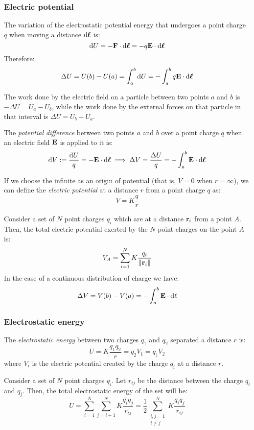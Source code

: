 \documentclass[../../../main.tex]{subfiles}
\begin{document}
\begin{multicols}{2}
    \subsubsection{Electric potential}
    \begin{prop}
        The variation of the electrostatic potential energy that undergoes a point charge $q$ when moving a distance $\dd\boldsymbol{\mathrm{\ell}}$ is:
        $$\dd U=-\boldsymbol{\mathrm{F}}\cdot \dd\boldsymbol{\mathrm{\ell}}=-q\boldsymbol{\mathrm{E}}\cdot \dd\boldsymbol{\mathrm{\ell}}$$
        Therefore:
        $$\Delta U=U(b)-U(a)=\int_a^b\dd U=-\int_a^bq\boldsymbol{\mathrm{E}}\cdot \dd \boldsymbol{\mathrm{\ell}}$$
    \end{prop}
    \begin{prop}
        The work done by the electric field on a particle between two points $a$ and $b$ is $-\Delta U=U_a-U_b$, while the work done by the external forces on that particle in that interval is $\Delta U=U_b-U_a$.
    \end{prop}
    \begin{definition}
        The \textit{potential difference} between two points $a$ and $b$ over a point charge $q$ when an electric field $\boldsymbol{\mathrm{E}}$ is applied to it is:
        $$\dd V:=\frac{\dd U}{q}=-\boldsymbol{\mathrm{E}}\cdot\dd \boldsymbol{\mathrm{\ell}}\implies\Delta V=\frac{\Delta U}{q}=-\int_a^b\boldsymbol{\mathrm{E}}\cdot\dd \boldsymbol{\mathrm{\ell}}$$
    \end{definition}
    \begin{definition}
        If we choose the infinite as an origin of potential (that is, $V=0$ when $r=\infty$), we can define the \textit{electric potential} at a distance $r$ from a point charge $q$ as: $$V=K\frac{q}{r}$$
    \end{definition}
    \begin{principle}
        Consider a set of $N$ point charges $q_i$ which are at a distance $\boldsymbol{\mathrm{r}}_i$ from a point $A$. Then, the total electric potential exerted by the $N$ point charges on the point $A$ is:
        $$V_A=\sum_{i=1}^NK\frac{q_i}{\|\boldsymbol{\mathrm{r}}_{i}\|}$$
        In the case of a continuous distribution of charge we have:
        $$\Delta V=V(b)-V(a)=-\int_a^b\boldsymbol{\mathrm{E}}\cdot\dd\ell$$
    \end{principle}
    \subsubsection{Electrostatic energy}
    \begin{definition}
        The \textit{electrostatic energy} between two charges $q_1$ and $q_2$ separated a distance $r$ is: $$U=K\frac{q_1q_2}{r}=q_2V_1=q_1V_2$$
        where $V_i$ is the electric potential created by the charge $q_i$ at a distance $r$.
    \end{definition}
    \begin{prop}
        Consider a set of $N$ point charges $q_i$. Let $r_{ij}$ be the distance between the charge $q_i$ and $q_j$. Then, the total electrostatic energy of the set will be: $$U=\sum_{i=1}^N\sum_{j=i+1}^NK\frac{q_iq_j}{r_{ij}}=\frac{1}{2}\sum_{\substack{i,j=1\\i\ne j}}^NK\frac{q_iq_j}{r_{ij}}$$
    \end{prop}

\end{multicols}
\end{document}
